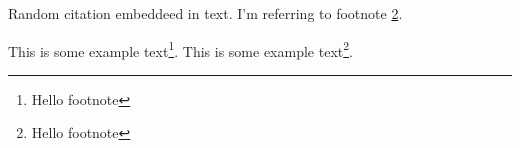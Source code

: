 \documentclass{article}
\begin{document}
Random citation \cite{DUMMY:1} embeddeed in text.
I'm referring to footnote \ref{myfootnote}.

\newpage
This is some example text\footnote{\label{myfootnote}Hello footnote}.
This is some example text\footnote{\label{myfootnote}Hello footnote}.


\newpage

 

\end{document}
